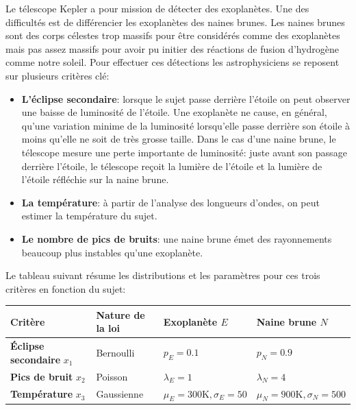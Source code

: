 \documentclass[solutions]{../exercices}
\begin{document}
	\begin{exercice}
		Le télescope Kepler a pour mission de détecter des exoplanètes. Une des difficultés est de différencier les exoplanètes des naines brunes. Les naines brunes sont des corps célestes trop massifs pour être considérés comme des exoplanètes mais pas assez massifs pour avoir pu initier des réactions de fusion d'hydrogène comme notre soleil. Pour effectuer ces détections les astrophysiciens se reposent sur plusieurs critères clé:

		\begin{itemize}
			\item \textbf{L'éclipse secondaire}: lorsque le sujet passe derrière l'étoile on peut observer une baisse de luminosité de l'étoile. Une exoplanète ne cause, en général, qu'une variation minime de la luminosité lorsqu'elle passe derrière son étoile à moins qu'elle ne soit de très grosse taille. Dans le cas d'une naine brune, le télescope mesure une perte importante de luminosité: juste avant son passage derrière l'étoile, le télescope reçoit la lumière de l'étoile et la lumière de l'étoile réfléchie sur la naine brune.
			\item \textbf{La température}: à partir de l'analyse des longueurs d'ondes, on peut estimer la température du sujet.
			\item \textbf{Le nombre de pics de bruits}: une naine brune émet des rayonnements beaucoup plus instables qu'une exoplanète.
		\end{itemize}

		Le tableau suivant résume les distributions et les paramètres pour ces trois critères en fonction du sujet:

		\begin{table}[h]
			\centering
			\begin{tabular}{|l|l|l|l|}
				\hline
				\textbf{Critère}                  & \textbf{Nature de la loi} & \textbf{Exoplanète} $E$        & \textbf{Naine brune} $N$         \\
				\hline
				\textbf{\'Eclipse secondaire} $x_1$ & Bernoulli               & $p_E = 0.1$                    & $p_N = 0.9$                      \\
				\hline
				\textbf{Pics de bruit} $x_2$      & Poisson                   & $\lambda_E = 1$                & $\lambda_N = 4$                  \\
				\hline
				\textbf{Température} $x_3$        & Gaussienne                & $\mu_E = 300 \text{K}, \sigma_E = 50$ & $\mu_N = 900 \text{K}, \sigma_N = 500$ \\
				\hline
			\end{tabular}
		\end{table}


\end{exercice}
\end{document}

